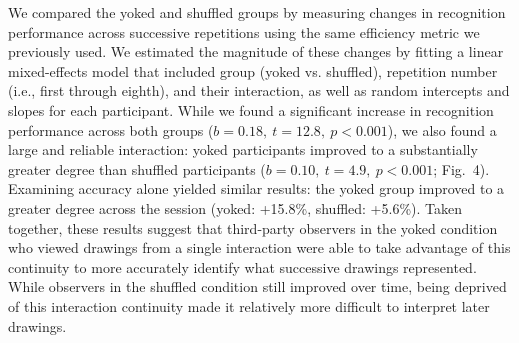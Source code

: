 We compared the yoked and shuffled groups by measuring changes in recognition performance across successive repetitions using the same efficiency metric we previously used.
We estimated the magnitude of these changes by fitting a linear mixed-effects model that included group (yoked vs. shuffled), repetition number (i.e., first through eighth), and their interaction, as well as random intercepts and slopes for each participant.
While we found a significant increase in recognition performance across both groups ($b = 0.18, ~t = 12.8, ~p < 0.001$), %
we also found a large and reliable interaction:
yoked participants improved to a substantially greater degree than shuffled participants ($b = 0.10, ~t = 4.9, ~p<0.001$; Fig.~4).
Examining accuracy alone yielded similar results: the yoked group improved to a greater degree across the session (yoked: +15.8\%, shuffled: +5.6\%).
Taken together, these results suggest that third-party observers in the yoked condition who viewed drawings from a single interaction were able to take advantage of this continuity to more accurately identify what successive drawings represented.
While observers in the shuffled condition still improved over time, being deprived of this interaction continuity made it relatively more difficult to interpret later drawings.





